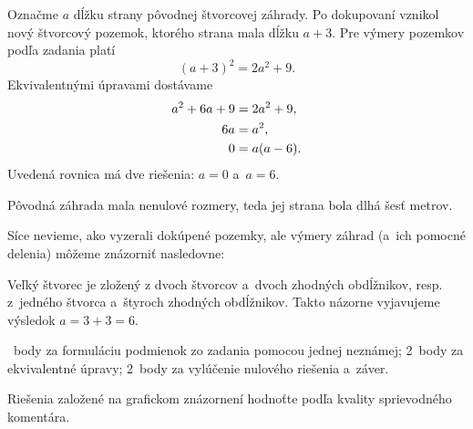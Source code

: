 {%
Označme $a$ dĺžku strany pôvodnej štvorcovej záhrady.
Po dokupovaní vznikol nový štvorcový pozemok, ktorého strana mala dĺžku $a+3$.
Pre výmery pozemkov podľa zadania platí
$$
(a+3)^2 = 2 a^2 + 9.
$$
Ekvivalentnými úpravami dostávame
$$
\aligned
a^2 + 6a + 9 &= 2 a^2 + 9, \\
6a &= a^2, \\
0&=a(a-6).
\endaligned
$$
Uvedená rovnica má dve riešenia: $a=0$ a~$a=6$.

Pôvodná záhrada mala nenulové rozmery, teda jej strana bola dlhá šesť metrov.

\poznamka
Síce nevieme, ako vyzerali dokúpené pozemky, ale výmery záhrad (a~ich pomocné delenia) môžeme znázorniť nasledovne:
%

Veľký štvorec je zložený z dvoch štvorcov a~dvoch zhodných obdĺžnikov, resp. z~jedného štvorca a~štyroch zhodných obdĺžnikov.
Takto názorne vyjavujeme výsledok $a=3+3=6$.

~body za formuláciu podmienok zo zadania pomocou jednej neznámej;
2~body za ekvivalentné úpravy;
2~body za vylúčenie nulového riešenia a~záver.

Riešenia založené na grafickom znázornení hodnoťte podľa kvality sprievodného komentára.
\eres
}


